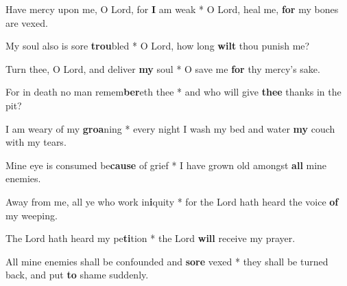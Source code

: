 \begin{multicols}{2}
	Have mercy upon me, O Lord, for \textbf{I} am weak * O Lord, heal me, \textbf{for} my bones are vexed.
	
	My soul also is sore \textbf{trou}bled * O Lord, how long \textbf{wilt} thou punish me?
	
	Turn thee, O Lord, and deliver \textbf{my} soul * O save me \textbf{for} thy mercy's sake.
	
	For in death no man remem\textbf{ber}eth thee * and who will give \textbf{thee} thanks in the pit?
	
	I am weary of my \textbf{groa}ning * every night I wash my bed and water \textbf{my} couch with my tears.
	
	Mine eye is consumed be\textbf{cause} of grief * I have grown old amongst \textbf{all} mine enemies.
	
	Away from me, all ye who work in\textbf{i}quity * for the Lord hath heard the voice \textbf{of} my weeping.
	
	The Lord hath heard my pe\textbf{ti}tion * the Lord \textbf{will} receive my prayer.
	
	All mine enemies shall be confounded and \textbf{sore} vexed * they shall be turned back, and put \textbf{to} shame suddenly.
\end{multicols}